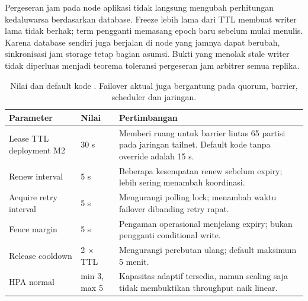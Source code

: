 Pergeseran jam pada node aplikasi tidak langsung mengubah perhitungan kedaluwarsa berdasarkan database. Freeze lebih lama dari TTL membuat writer lama tidak berhak; term pengganti memasang epoch baru sebelum mulai menulis. Karena database sendiri juga berjalan di node yang jamnya dapat berubah, sinkronisasi jam storage tetap bagian asumsi. Bukti yang menolak stale writer tidak diperluas menjadi teorema toleransi pergeseran jam arbitrer semua replika.

\begin{table}[htbp]\centering
\begin{tabularx}{\textwidth}{@{}P{5cm}P{2.4cm}Y@{}}
\toprule Parameter & Nilai & Pertimbangan\\\midrule
Lease TTL deployment M2 & 30 s & Memberi ruang untuk barrier lintas 65 partisi pada jaringan tailnet. Default kode tanpa override adalah 15 s.\\
Renew interval & 5 s & Beberapa kesempatan renew sebelum expiry; lebih sering menambah koordinasi.\\
Acquire retry interval & 5 s & Mengurangi polling lock; menambah waktu failover dibanding retry rapat.\\
Fence margin & 5 s & Pengaman operasional menjelang expiry; bukan pengganti conditional write.\\
Release cooldown & 2 $\times$ TTL & Mengurangi perebutan ulang; default maksimum 5 menit.\\
HPA normal & min 3, max 5 & Kapasitas adaptif tersedia, namun scaling saja tidak membuktikan throughput naik linear.\\\bottomrule
\end{tabularx}
\caption{Nilai  dan default kode . Failover aktual juga bergantung pada quorum, barrier, scheduler dan jaringan.}
\end{table}

